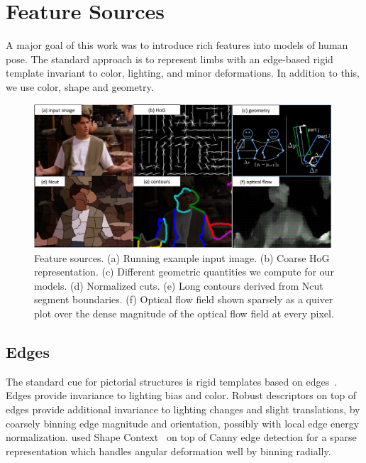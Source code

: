 \chapter{Feature Sources}\label{sec:features}


A major goal of this work was to introduce rich features into models of human 
pose.  The standard approach is to represent limbs with an edge-based rigid 
template invariant to color, lighting, and minor deformations. In addition to 
this, we use color, shape and geometry. 


\begin{figure}[tb]
\begin{center}
\includegraphics[width=1.05\textwidth]{figs/feature-sources.pdf}
\caption[Feature sources.]{Feature sources. (a) Running example input image.  
(b) Coarse HoG representation. (c) Different geometric quantities we compute 
for our models. (d) Normalized cuts.  (e) Long contours derived from Ncut 
segment boundaries. (f) Optical flow field shown sparsely as a quiver plot over 
the dense magnitude of the optical flow field at every pixel.}
\label{fig:feature-sources}
\end{center}
\end{figure}



\section{Edges}\label{sec:edges}
The standard cue for pictorial structures is rigid templates based on 
edges~\citep{ferrari08,eichner09,andriluka09,ddtran,devacrf,deva2011}.  Edges 
provide invariance to lighting bias and color.  Robust descriptors on top of 
edges provide additional invariance to lighting changes and slight 
translations, by coarsely binning edge magnitude and orientation, possibly with 
local edge energy normalization.  \citet{andriluka09} used Shape 
Context~\citep{belongie2001} on top of Canny edge detection for a sparse 
representation which handles angular deformation well by binning radially.  

